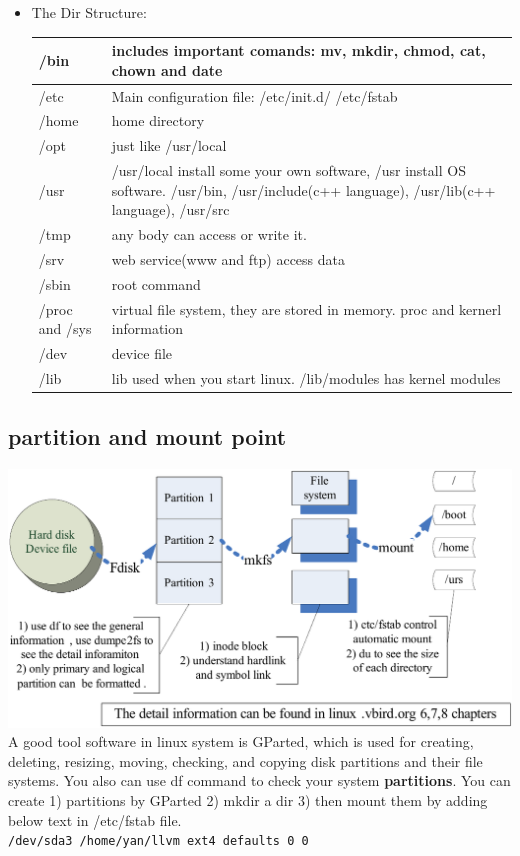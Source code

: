 \documentclass[a4paper,12pt,twoside]{book}
\begin{document}
\begin{itemize}
     \item The Dir Structure:\\
\begin{tabular}{p{}|p{}}
  \hline
  /bin & includes important comands: mv, mkdir, chmod, cat, chown and date  \\
 \hline  /etc & Main configuration file: /etc/init.d/ /etc/fstab \\
  \hline /home & home directory \\
  \hline /opt & just like /usr/local  \\
  \hline /usr & /usr/local install some your own software, /usr install OS software.  /usr/bin, /usr/include(c++ language), /usr/lib(c++ language),  /usr/src \\
  \hline /tmp & any body can access or write it.     \\
  \hline /srv & web service(www and ftp) access data \\
  \hline /sbin & root command \\
  \hline /proc and /sys & virtual file system, they are stored in memory.  proc and kernerl information \\
  \hline /dev & device file \\
  \hline /lib & lib used when you start linux. /lib/modules has kernel modules \\
  \hline 
\end{tabular}

\end{itemize} 
\subsection{partition and mount point}
	\includegraphics[scale=0.8]{pics/basic_file_system_clip}
	\\ 
   A good tool software in linux system is GParted, which  is used for creating, deleting, resizing, moving, checking, and copying disk partitions and their file systems.  You also can use df command to check your system \textbf{partitions}. You can create 1) partitions by GParted 2) mkdir a dir 3) then mount them by adding below text in /etc/fstab file.    \\   
   \verb=/dev/sda3 /home/yan/llvm ext4 defaults 0 0=
   
\end{document}
